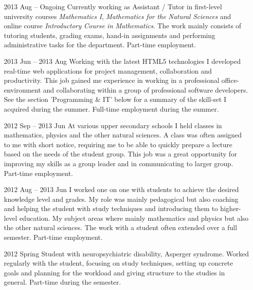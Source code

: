 
      {2013 Aug -- Ongoing}
      {Currently working as Assistant / Tutor in first-level
       university courses \emph{Mathematics I}, \emph{Mathematics for the Natural Sciences}
       and online course \emph{Introductory Course in Mathematics}.
       The work mainly consists of tutoring students, grading exams, hand-in assignments and
       performing administrative tasks for the department. Part-time employment.}

      {2013 Jun -- 2013 Aug}
      {Working with the latest HTML5 technologies I developed real-time
       web applications for project management, collaboration and productivity.
       This job gained me experience in working in a professional office-environment
       and collaborating within a group of professional software developers.
       See the section 'Programming \& IT' below for a summary of the skill-set I acquired during the summer.
       Full-time employment during the summer.}

      {2012 Sep -- 2013 Jun}
      {At various upper secondary schools I held classes in
       mathematics, physics and the other natural sciences.
       A class was often assigned to me with
       short notice, requiring me to be able to quickly prepare a lecture
       based on the needs of the student group. This job was a great
       opportunity for improving my skills as a group leader and in
       communicating to larger group. Part-time employment.}

      {2012 Aug -- 2013 Jun}
      {I worked one on one with students to achieve the desired knowledge level and
       grades. My role was mainly pedagogical but also coaching and helping
       the student with study techniques and introducing them to higher-level
       education. My subject areas where mainly mathematics and physics but also the
       other natural sciences. The work with a student often extended over a full semester.
       Part-time employment.}

      {2012 Spring}
      {Student with neuropsychiatric disability, Asperger syndrome.
       Worked regularly with the student, focusing on study techniques,
       setting up concrete goals and planning for the workload and giving
       structure to the studies in general. Part-time during the semester.}
